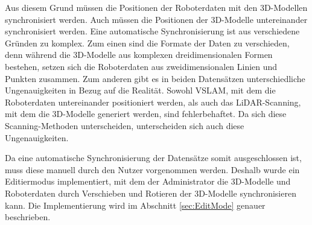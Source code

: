 Aus diesem Grund müssen die Positionen der Roboterdaten mit den 3D-Modellen synchronisiert werden. Auch müssen die Positionen der 3D-Modelle untereinander synchronisiert werden. Eine automatische Synchronisierung ist aus verschiedene Gründen zu komplex. Zum einen sind die Formate der Daten zu verschieden, denn während die 3D-Modelle aus komplexen dreidimensionalen Formen bestehen, setzen sich die Roboterdaten aus zweidimensionalen Linien und Punkten zusammen. Zum anderen gibt es in beiden Datensätzen unterschiedliche Ungenauigkeiten in Bezug auf die Realität. Sowohl \ac{VSLAM}, mit dem die Roboterdaten untereinander positioniert werden, als auch das \ac{LiDAR}-Scanning, mit dem die 3D-Modelle generiert werden, sind fehlerbehaftet. Da sich diese Scanning-Methoden unterscheiden, unterscheiden sich auch diese Ungenauigkeiten.

Da eine automatische Synchronisierung der Datensätze somit ausgeschlossen ist, muss diese manuell durch den Nutzer vorgenommen werden. Deshalb wurde ein Editiermodus implementiert, mit dem der Administrator die 3D-Modelle und Roboterdaten durch Verschieben und Rotieren der 3D-Modelle synchronisieren kann. Die Implementierung wird im Abschnitt \ref{sec:EditMode} genauer beschrieben.
